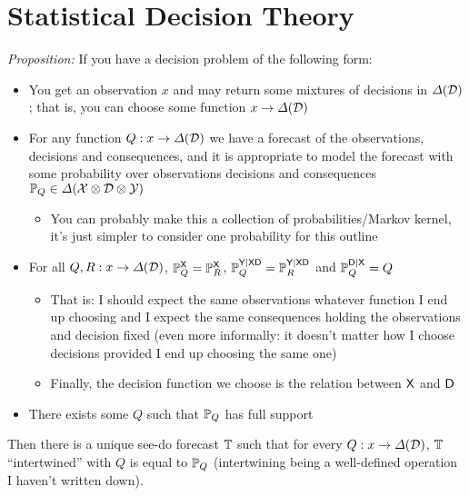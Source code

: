 
\chapter{Statistical Decision Theory}


\emph{Proposition:} If you have a decision problem of the following form:

\begin{itemize}
    \item You get an observation $x$ and may return some mixtures of decisions in $\Delta(\mathcal{D})$; that is, you can choose some function $x\to \Delta(\mathcal{D})$
    \item For any function $Q:x\to \Delta(\mathcal{D})$ we have a forecast of the observations, decisions and consequences, and it is appropriate to model the forecast with some probability over observations decisions and consequences $\mathbb{P}_Q\in \Delta(\mathcal{X}\otimes\mathcal{D}\otimes\mathcal{Y})$
    \begin{itemize}
        \item You can probably make this a collection of probabilities/Markov kernel, it's just simpler to consider one probability for this outline
    \end{itemize}
    \item For all $Q,R:x\to \Delta(\mathcal{D})$, $\mathbb{P}_Q^{\mathsf{X}}=\mathbb{P}_R^{\mathsf{X}}$, $\mathbb{P}_Q^{\mathsf{Y}|\mathsf{X}\mathsf{D}}=\mathbb{P}_R^{\mathsf{Y}|\mathsf{X}\mathsf{D}}$ and $\mathbb{P}_Q^{\mathsf{D}|\mathsf{X}}=Q$
    \begin{itemize}
        \item That is: I should expect the same observations whatever function I end up choosing and I expect the same consequences holding the observations and decision fixed (even more informally: it doesn't matter how I choose decisions provided I end up choosing the same one)
        \item Finally, the decision function we choose is the relation between $\mathsf{X}$ and $\mathsf{D}$
    \end{itemize}
    \item There exists some $Q$ such that $\mathbb{P}_Q$ has full support
\end{itemize}

Then there is a unique see-do forecast $\mathbb{T}$ such that for every $Q:x\to \Delta(\mathcal{D})$, $\mathbb{T}$ ``intertwined'' with $Q$ is equal to $\mathbb{P}_Q$ (intertwining being a well-defined operation I haven't written down).

